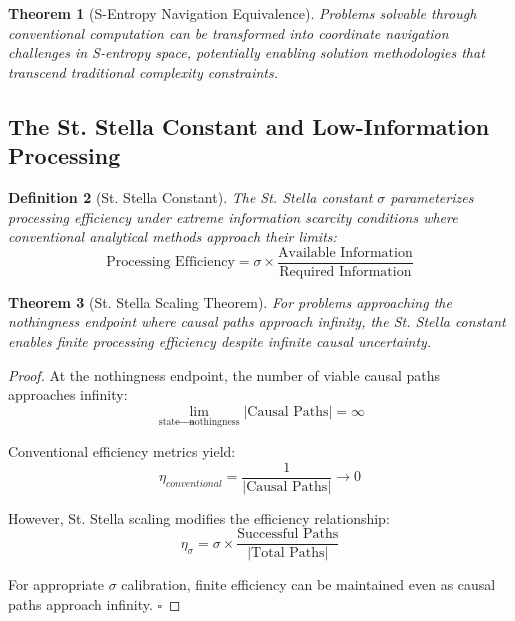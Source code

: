 \documentclass[11pt,a4paper]{article}
\newtheorem{theorem}{Theorem}[section]
\newtheorem{definition}[theorem]{Definition}
\theoremstyle{remark}
\begin{document}
\begin{theorem}[S-Entropy Navigation Equivalence]
Problems solvable through conventional computation can be transformed into coordinate navigation challenges in S-entropy space, potentially enabling solution methodologies that transcend traditional complexity constraints.
\end{theorem}

\subsection{The St. Stella Constant and Low-Information Processing}

\begin{definition}[St. Stella Constant]
The St. Stella constant $\sigma$ parameterizes processing efficiency under extreme information scarcity conditions where conventional analytical methods approach their limits:
\begin{equation}
\text{Processing Efficiency} = \sigma \times \frac{\text{Available Information}}{\text{Required Information}}
\label{eq:stella_efficiency}
\end{equation}
\end{definition}

\begin{theorem}[St. Stella Scaling Theorem]
For problems approaching the nothingness endpoint where causal paths approach infinity, the St. Stella constant enables finite processing efficiency despite infinite causal uncertainty.
\end{theorem}

\begin{proof}
At the nothingness endpoint, the number of viable causal paths approaches infinity:
\begin{equation}
\lim_{\text{state} \to \text{nothingness}} |\text{Causal Paths}| = \infty
\end{equation}

Conventional efficiency metrics yield:
\begin{equation}
\eta_{conventional} = \frac{1}{|\text{Causal Paths}|} \to 0
\end{equation}

However, St. Stella scaling modifies the efficiency relationship:
\begin{equation}
\eta_{\sigma} = \sigma \times \frac{\text{Successful Paths}}{|\text{Total Paths}|}
\label{eq:stella_efficiency_modified}
\end{equation}

For appropriate $\sigma$ calibration, finite efficiency can be maintained even as causal paths approach infinity. $\square$
\end{proof}
\end{document}
